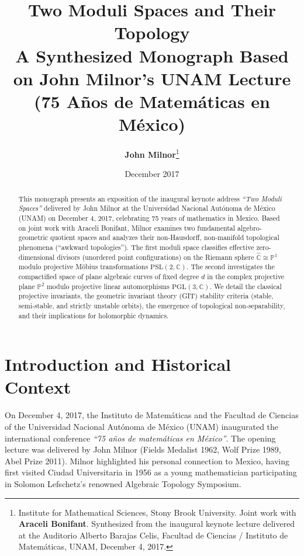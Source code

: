 \documentclass[11pt,a4paper]{article}
\title{\textbf{Two Moduli Spaces and Their Topology}\\[0.5em]
\large A Synthesized Monograph Based on John Milnor's UNAM Lecture (75 A\~nos de Matem\'aticas en M\'exico)}
\author{\textbf{John Milnor}\thanks{Institute for Mathematical Sciences, Stony Brook University. Joint work with \textbf{Araceli Bonifant}. Synthesized from the inaugural keynote lecture delivered at the Auditorio Alberto Barajas Celis, Facultad de Ciencias / Instituto de Matem\'aticas, UNAM, December 4, 2017.}}
\date{December 2017}
\begin{document}
\maketitle

\begin{abstract}
This monograph presents an exposition of the inaugural keynote address \textit{``Two Moduli Spaces''} delivered by John Milnor at the Universidad Nacional Aut\'onoma de M\'exico (UNAM) on December 4, 2017, celebrating 75 years of mathematics in Mexico. Based on joint work with Araceli Bonifant, Milnor examines two fundamental algebro-geometric quotient spaces and analyzes their non-Hausdorff, non-manifold topological phenomena (``awkward topologies''). The first moduli space classifies effective zero-dimensional divisors (unordered point configurations) on the Riemann sphere $\widehat{\mathbb{C}} \cong \mathbb{P}^1$ modulo projective M\"obius transformations $\mathrm{PSL}(2, \mathbb{C})$. The second investigates the compactified space of plane algebraic curves of fixed degree $d$ in the complex projective plane $\mathbb{P}^2$ modulo projective linear automorphisms $\mathrm{PGL}(3, \mathbb{C})$. We detail the classical projective invariants, the geometric invariant theory (GIT) stability criteria (stable, semi-stable, and strictly unstable orbits), the emergence of topological non-separability, and their implications for holomorphic dynamics.
\end{abstract}

\tableofcontents
\newpage

\section{Introduction and Historical Context}

On December 4, 2017, the Instituto de Matem\'aticas and the Facultad de Ciencias of the Universidad Nacional Aut\'onoma de M\'exico (UNAM) inaugurated the international conference \textit{``75 a\~nos de matem\'aticas en M\'exico''}. The opening lecture was delivered by John Milnor (Fields Medalist 1962, Wolf Prize 1989, Abel Prize 2011). Milnor highlighted his personal connection to Mexico, having first visited Ciudad Universitaria in 1956 as a young mathematician participating in Solomon Lefschetz's renowned Algebraic Topology Symposium.
\end{document}
